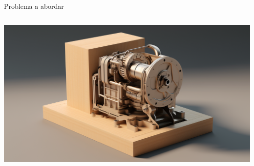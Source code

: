 \documentclass[14pt, aspectratio = 1610, xcolor=table, structureblod]{beamer}
\begin{document}
\begin{frame}{Problema a abordar}
\begin{columns}[totalwidth = 0.89\textwidth]
\begin{column}{0.43\linewidth}
		\vskip 0.3cm%
		\includegraphics[width = \linewidth]{mechanism}
	\end{column}
	\end{columns}
\end{frame}
\end{document}
